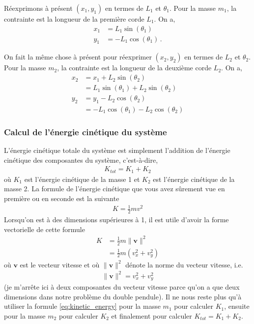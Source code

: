 \documentclass[titlepage]{article}
\theoremstyle{cleanremark}
\begin{document}
\noindent Réexprimons à présent $(x_1, y_1)$ en termes de $L_1$ et $\theta_1$. Pour la masse $m_1$, la contrainte est la longueur de la première corde $L_1$. On a,
\begin{align}
    x_1 &= L_1\sin (\theta_1) \label{eq:m1_double_pendulum}\\
    y_1 &= -L_1\cos(\theta_1) \, .
\end{align}

\noindent On fait la même chose à présent pour réexprimer $(x_2, y_2)$ en termes de $L_2$ et $\theta_2$. Pour la masse $m_2$, la contrainte est la longueur de la deuxième corde $L_2$. On a, 
\begin{align}
    x_2 &= x_1 + L_2\sin(\theta_2) \\
    &= L_1\sin(\theta_1) + L_2\sin(\theta_2)
        \\
    y_2 &=y_1 -L_2\cos(\theta_2)\\
    &= -L_1\cos(\theta_1)-L_2\cos(\theta_2)
\end{align}

\subsubsection{Calcul de l'énergie cinétique du système}
L'énergie cinétique totale du système est simplement l'addition de l'énergie cinétique des composantes du système, c'est-à-dire,  
\begin{align}
    K_{tot} = K_1 + K_2
\end{align}
où $K_1$ est l'énergie cinétique de la masse 1 et $K_2$ est l'énergie cinétique de la masse 2. La formule de l'énergie cinétique que vous avez sûrement vue en première ou en seconde est la suivante
\begin{align}
    K = \frac{1}{2}mv^2
\end{align}
Lorsqu'on est à des dimensions supérieures à 1, il est utile d'avoir la forme vectorielle de cette formule
\begin{align}
    K &= \frac{1}{2}m\lVert \mathbf{v}\rVert^2
    \\
    &=\frac{1}{2}m(v_x^2 + v_y^2) \label{eq:kinetic_energy}
\end{align}
où $\mathbf{v}$ est le vecteur vitesse et où $\lVert \mathbf{v}\rVert^2$ dénote la norme du vecteur vitesse, i.e. 
\begin{align}
    \lVert \mathbf{v}\rVert^2 = v_x^2 + v_y^2
\end{align}
(je m'arrête ici à deux composantes du vecteur vitesse parce qu'on a que deux dimensions dans notre problème du double pendule).
Il ne nous reste plus qu'à utiliser la formule \cref{eq:kinetic_energy} pour la masse $m_1$ pour calculer $K_1$, ensuite pour la masse $m_2$ pour calculer $K_2$ et finalement pour calculer $K_{tot} = K_1 + K_2$.
\end{document}
